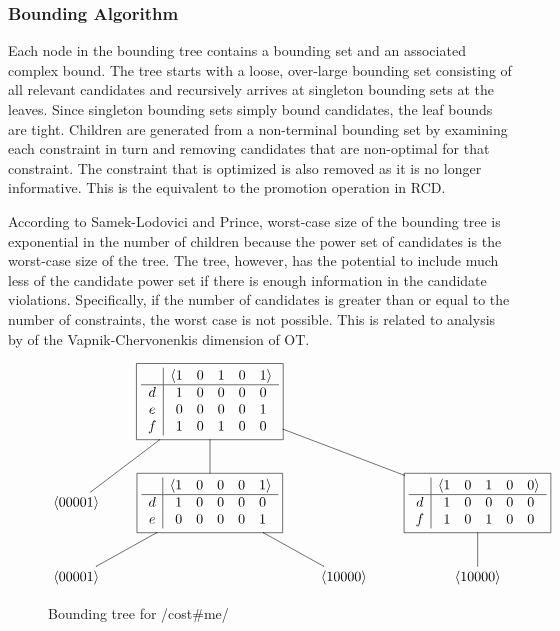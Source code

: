 \documentclass[11pt]{article}
\begin{document}
\subsubsection{Bounding Algorithm}

Each
node in the bounding tree contains a bounding set and an associated complex bound.
The tree starts with a loose, over-large bounding set consisting of
all relevant candidates and recursively arrives at singleton bounding sets
at the leaves. Since singleton bounding sets simply bound candidates,
the leaf bounds are tight. Children are generated from a non-terminal
bounding set by examining each constraint in turn and removing
candidates that are non-optimal for that constraint. The constraint
that is optimized is also removed as it is no longer informative. This
is the equivalent to the promotion operation in RCD.

According to Samek-Lodovici and Prince, worst-case size of the
bounding tree is exponential in the number of children because the
power set of candidates is the worst-case size of the tree. The tree,
however, has the potential to include much less of the candidate
power set if there is enough information in the candidate
violations. Specifically, if the number of candidates is greater than
or equal to the number of constraints, the worst case is not
possible. This is related to analysis by  of the
Vapnik-Chervonenkis dimension of OT.

\begin{figure}
\centering
\[ \xymatrix{
&*+ [F]{
    \begin{array}{c|rcccl}
      &\langle 1 & 0 & 1 & 0 & 1 \rangle \\ \hline
      d&1 & 0 & 0 & 0 & 0 \\
      e&0 & 0 & 0 & 0 & 1 \\
      f&1 & 0 & 1 & 0 & 0 \\
    \end{array}}
  \ar@{-}[dl] \ar@{-}[d] \ar@{-}[drr]
  && \\
\langle 0 0 0 0 1 \rangle&*+ [F]{
    \begin{array}{c|rcccl}
 &\langle 1 & 0 & 0 & 0 & 1 \rangle \\ \hline
 d&1 & 0 & 0 & 0 & 0 \\
 e&0 & 0 & 0 & 0 & 1 \\
\end{array}}\ar@{-}[dl]\ar@{-}[dr] && *+ [F]{
\begin{array}{c|rcccl}
 &\langle 1 & 0 & 1 & 0 & 0 \rangle \\ \hline
 d&1 & 0 & 0 & 0 & 0 \\
 f&1 & 0 & 1 & 0 & 0 \\
\end{array}}\ar@{-}[d] \\
\langle 0 0 0 0 1 \rangle &&
\langle 1 0 0 0 0 \rangle &\langle 1 0 0 0 0\rangle\\
}\]
\caption{Bounding tree for /cost\#me/}
\label{bounding-tree-costme}
\end{figure}
\end{document}
